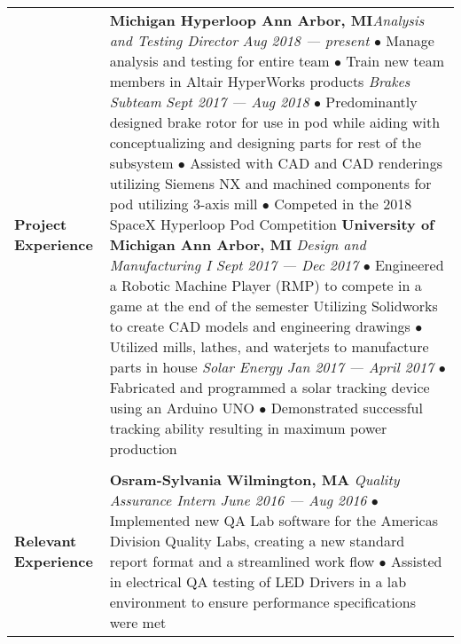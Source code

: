 \documentclass[12pt]{article}
\begin{document}
\begin{table}[H]
\begin{tabularx}{\textwidth}{@{}X p{6.25in} @{}}
		\textbf{Project Experience} & \textbf{Michigan Hyperloop \hfill Ann Arbor, MI}\newline \textit{Analysis and Testing Director} \hfill \textit{Aug 2018 --- present} \newline {\small$\bullet$
		Manage analysis and testing for entire team \newline $\bullet$
		Train new team members in Altair HyperWorks products} \newline \textit{Brakes Subteam} \hfill \textit{Sept 2017 --- Aug 2018} \newline {\small$\bullet$
		Predominantly designed brake rotor for use in pod while aiding with conceptualizing and designing parts for rest of the subsystem \newline $\bullet$
		Assisted with CAD and CAD renderings utilizing Siemens NX and machined components for pod utilizing 3-axis mill \newline $\bullet$
		Competed in the 2018 SpaceX Hyperloop Pod Competition} \newline
		\textbf{University of Michigan \hfill Ann Arbor, MI} \newline \textit{Design and Manufacturing I \hfill Sept 2017 --- Dec 2017 } \newline {\small$\bullet$ 
		Engineered a Robotic Machine Player (RMP) to compete in a game at the end of the semester Utilizing Solidworks to create CAD models and engineering drawings \newline $\bullet$ 
		Utilized mills, lathes, and waterjets to manufacture parts in house} \newline \textit{Solar Energy \hfill Jan 2017 --- April 2017} \newline {\small$\bullet$ 
		Fabricated and programmed a solar tracking device using an Arduino UNO \newline $\bullet$ 
		Demonstrated successful tracking ability resulting in maximum power production}\\
		 
		 & \\

		\textbf{Relevant Experience} & \textbf{Osram-Sylvania \hfill Wilmington, MA} \newline \textit{Quality Assurance Intern \hfill June 2016 --- Aug 2016} \newpage {\small$\bullet$ 
		Implemented new QA Lab software for the Americas Division Quality Labs, creating a new standard report format and a streamlined work flow\newline $\bullet$ 
		Assisted in electrical QA testing of LED Drivers in a lab environment to ensure performance specifications were met}\\


\end{tabularx}
\end{table}
\end{document}
